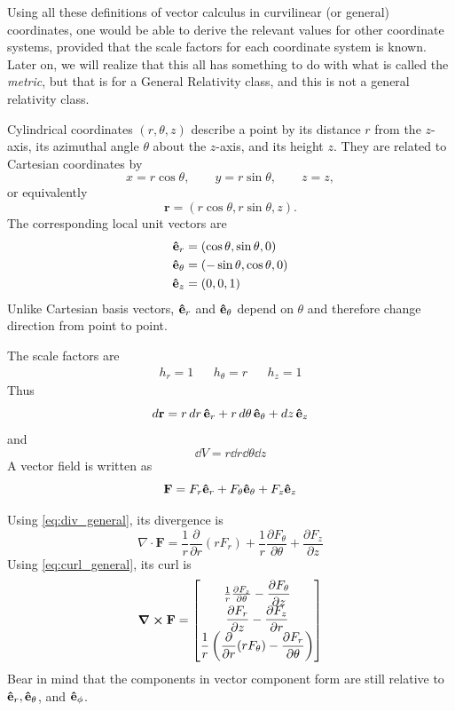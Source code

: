 			Using all these definitions of vector calculus in curvilinear (or general) coordinates,
			one would be able to derive the relevant values for other coordinate systems, provided
			that the scale factors for each coordinate system is known. Later on, we will realize
			that this all has something to do with what is called the \textit{metric}, but that
			is for a General Relativity class, and this is not a general relativity class.
			\newpage

			Cylindrical coordinates $(r,\theta,z)$ describe a point by its distance $r$ from the $z$-axis, its azimuthal angle $\theta$ about the $z$-axis, and its height $z$. They are related to Cartesian coordinates by
			\[
				x=r\cos\theta,
				\qquad
				y=r\sin\theta,
				\qquad
				z=z,
			\]
			or equivalently
			\[
				\mathbf r
				=
				(r\cos\theta,
				r\sin\theta,
				z).
			\]
			The corresponding local unit vectors are
			\begin{align*}
				\vu{e}_r	
				&=
				(\cos\theta,\sin\theta,0)\\
				\vu{e}_\theta
				&=
				(-\sin\theta,\cos\theta,0)\\
				\vu{e}_z
				&=
				(0,0,1)
			\end{align*}
			Unlike Cartesian basis vectors, $\vu{e}_r$ and $\vu{e}_\theta$ depend on $\theta$ and therefore change direction from point to point.

			The scale factors are
			\begin{align*}
				h_r = 1 && h_\theta = r && h_z = 1
			\end{align*}
			Thus
			\[
				\dd{\vb r} = r\dd{r} \vu{e}_r + r\dd{\theta}\vu{e}_\theta + \dd{z}\vu{e}_z
			\]
			and
			\[
				\dd{V} = r\dd{r}\dd{\theta}\dd{z}
			\]
			A vector field is written as
			\[
				\vb{F} = F_r \vu{e}_r + F_\theta \vu{e}_\theta + F_z \vu{e}_z
			\]

			Using \eqref{eq:div_general}, its divergence is
			\begin{equation}
				\nabla\cdot\mathbf F
				=
				\frac{1}{r}\frac{\partial}{\partial r}(rF_r)
				+
				\frac{1}{r}\frac{\partial F_\theta}{\partial\theta}
				+
				\frac{\partial F_z}{\partial z}
			\end{equation}
			Using \eqref{eq:curl_general}, its curl is
			\begin{equation}
				\curl\vb{F} = \bmqty{
					\frac{1}{r}\frac{\partial F_z}{\partial\theta}
					-
					\dfrac{\partial F_\theta}{\partial z}
					\\
					\dfrac{\partial F_r}{\partial z}
					-
					\dfrac{\partial F_z}{\partial r}
					\\
					\dfrac{1}{r}
					\left(
					\dfrac{\partial}{\partial r}(rF_\theta)
					-
					\dfrac{\partial F_r}{\partial\theta}
					\right)
				}
			\end{equation}
			Bear in mind that the components in vector component form
			are still relative to $\vu{e}_r, \vu{e}_\theta$, and $\vu{e}_\phi$.

